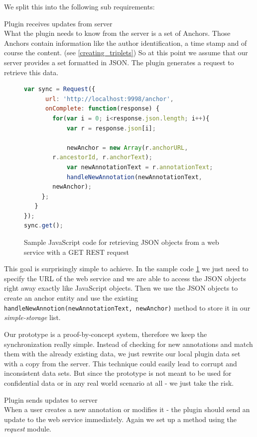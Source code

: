 We split this into the following sub requirements:
\begin{description}
\item Plugin receives updates from server\\
What the plugin needs to know from the server is a set of Anchors. Those Anchors contain information like the author identification, a time stamp and of course the content.
(see \ref{creating_triplets}) 
So at this point we assume that our server provides a set formatted in JSON. The plugin generates a request to retrieve this data. 
\begin{figure}
\begin{lstlisting}[language=JavaScript]
var sync = Request({
      url: 'http://localhost:9998/anchor',
      onComplete: function(response) {
        for(var i = 0; i<response.json.length; i++){
            var r = response.json[i];

            newAnchor = new Array(r.anchorURL, 
		r.ancestorId, r.anchorText);
            var newAnnotationText = r.annotationText;
            handleNewAnnotation(newAnnotationText, 
		newAnchor);
     };
   }
});
sync.get();
\end{lstlisting}
\label{anchor_sample_code}
\caption{Sample JavaScript code for retrieving JSON objects from a web service with a GET REST request}
\end{figure}

This goal is surprisingly simple to achieve. In the sample code \ref{anchor_sample_code} we just need to specify the URL of the web service and we are able to access the JSON objects right away exactly like JavaScript objects. Then we use the JSON objects to create an anchor entity and use the existing \verb| handleNewAnnotion(newAnnotationText, newAnchor)| method to store it in our \emph{simple-storage} list. 

Our prototype is a proof-by-concept system, therefore we keep the synchronization really simple. Instead of checking for new annotations and match them with the already existing data, we just rewrite our local plugin data set with a copy from the server. This technique could easily lead to corrupt and inconsistent data sets. But since the prototype is not meant to be used for confidential data or in any real world scenario at all - we just take the risk.

\item Plugin sends updates to server\\
When a user creates a new annotation or modifies it - the plugin should send an update to the web service immediately. Again we set up a method using the \emph{request} module. 
\end{description}

